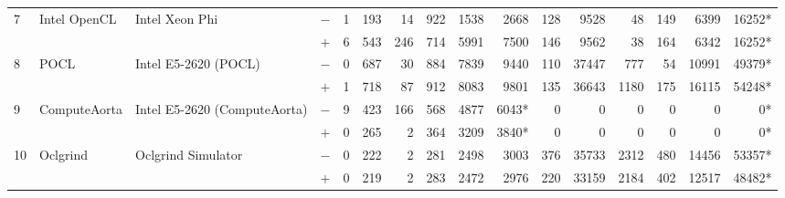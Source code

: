 \begin{tabular}{llll | rrrrrr | rrrrrr }
\hline
\multirow{ 2}{*}{7} & \multirow{ 2}{*}{Intel OpenCL} & \multirow{ 2}{*}{Intel Xeon Phi} & $-$ & 1 & 193 & 14 & 922 & 1538 & 2668       & 128 & 9528 & 48 & 149 & 6399 & 16252* \\& & & $+$ & 6 & 543 & 246 & 714 & 5991 & 7500 & 146 & 9562 & 38 & 164 & 6342 & 16252* \\
\hline
\multirow{ 2}{*}{8} & \multirow{ 2}{*}{POCL} & \multirow{ 2}{*}{Intel E5-2620 (POCL)} & $-$ & 0 & 687 & 30 & 884 & 7839 & 9440       & 110 & 37447 & 777 & 54 & 10991 & 49379* \\& & & $+$ & 1 & 718 & 87 & 912 & 8083 & 9801 & 135 & 36643 & 1180 & 175 & 16115 & 54248* \\
\hline
\multirow{ 2}{*}{9} & \multirow{ 2}{*}{ComputeAorta} & \multirow{ 2}{*}{Intel E5-2620 (ComputeAorta)} & $-$ & 9 & 423 & 166 & 568 & 4877 & 6043*       & 0 & 0 & 0 & 0 & 0 & 0* \\& & & $+$ & 0 & 265 & 2 & 364 & 3209 & 3840* & 0 & 0 & 0 & 0 & 0 & 0* \\
\hline
\multirow{ 2}{*}{10} & \multirow{ 2}{*}{Oclgrind} & \multirow{ 2}{*}{Oclgrind Simulator} & $-$ & 0 & 222 & 2 & 281 & 2498 & 3003       & 376 & 35733 & 2312 & 480 & 14456 & 53357* \\& & & $+$ & 0 & 219 & 2 & 283 & 2472 & 2976 & 220 & 33159 & 2184 & 402 & 12517 & 48482* \\
  \bottomrule
\end{tabular}

